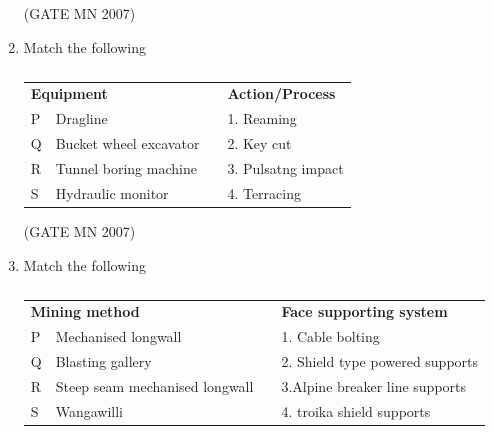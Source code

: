 \documentclass[journal]{IEEEtran}
\begin{document}
\begin{enumerate}
\hfill (GATE MN 2007)

\begin{enumerate}
\end{enumerate}




\item Match the following
\begin{table}[H]
    \centering\normalsize
\begin{tabular}{llcl}                             
\multicolumn{2}{l}{\textbf{Equipment  }} & & \textbf{Action/Process} \\
P & Dragline       &  & 1. Reaming \\ 
Q & Bucket wheel excavator    &  & 2. Key cut \\                     
R & Tunnel boring machine   &  & 3. Pulsatng impact    \\                                                
S & Hydraulic monitor   &  & 4. Terracing \\                                       
\end{tabular}
\caption{}
    \label{tab:Q33}
\end{table}


\hfill (GATE MN 2007)
\begin{enumerate}
\end{enumerate}



\item Match the following
\begin{table}[H]
    \centering\normalsize
\begin{tabular}{llcl}                             
\multicolumn{2}{l}{\textbf{Mining method    }} & & \textbf{Face supporting system} \\                       
P & Mechanised longwall     &  & 1. Cable bolting \\     
Q & Blasting gallery    &  & 2. Shield type powered supports \\                         
R & Steep seam mechanised longwall        &  & 3.Alpine breaker line supports     \\                                               
S & Wangawilli   &  & 4. troika shield supports \\                                          
\end{tabular}
\caption{}
    \label{tab:Q34}
\end{table}



\end{enumerate}
\end{document}
